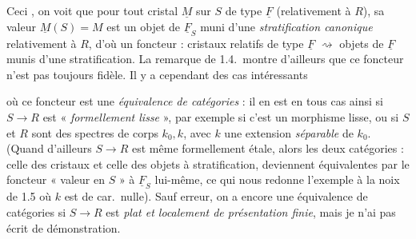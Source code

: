 \documentclass[11pt,a4paper]{article}
\begin{document}
Ceci , on voit que pour tout cristal $\underline{M}$ sur $S$ de type
$\underline{F}$ (relativement à $R$), sa valeur
$\underline{M}(S)=M$ est un objet de $\underline{F}_S$ muni d'une
\emph{stratification canonique} relativement à $R$, d'où un foncteur :
cristaux relatifs de type $\underline{F}$ $\rightsquigarrow$ objets de
$\underline{F}$ munis d'une stratification. La remarque de 1.4.\ montre
d'ailleurs que ce foncteur n'est pas toujours fidèle. Il y a cependant des cas
intéressants

où ce foncteur est une \emph{équivalence de catégories} : il en est en tous cas
ainsi si $S\to R$ est « \emph{formellement lisse} », par exemple si c'est un
morphisme lisse, ou si $S$ et $R$ sont des spectres de corps $k_0,k$, avec $k$
une extension \emph{séparable} de $k_0$. (Quand
d'ailleurs $S\to R$ est même formellement étale, alors les deux catégories :
celle des cristaux et celle des objets à stratification, deviennent
 équivalentes\add{,} par le foncteur « valeur en
$S$ »\add{,} à $\underline{F}_S$ lui-même, ce qui nous redonne l'exemple à la
noix de 1.5 où $k$ est de car.\ nulle). Sauf erreur, on a encore une
équivalence de catégories si $S\to R$ est \emph{plat et localement de
présentation finie},  mais je n'ai pas écrit de démonstration.
\end{document}
